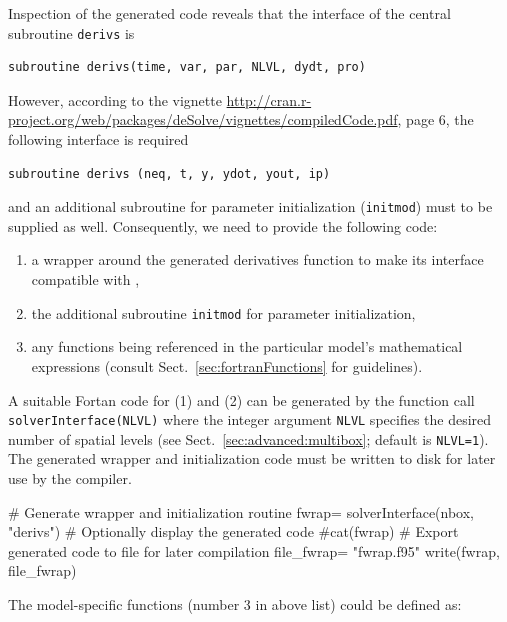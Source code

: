 \documentclass[times,onecolumn]{article}
\begin{document}
Inspection of the generated  code reveals that the interface of the central subroutine \verb|derivs| is

\begin{verbatim}
subroutine derivs(time, var, par, NLVL, dydt, pro)
\end{verbatim}

However, according to the  vignette \url{http://cran.r-project.org/web/packages/deSolve/vignettes/compiledCode.pdf}, page 6, the following interface is required

\begin{verbatim}
subroutine derivs (neq, t, y, ydot, yout, ip)
\end{verbatim}

and an additional subroutine for parameter initialization (\verb|initmod|) must to be supplied as well. Consequently, we need to provide the following  code:

\begin{enumerate}
\item a wrapper around the generated derivatives function to make its interface compatible with ,
\item the additional subroutine \verb|initmod| for parameter initialization,
\item any functions being referenced in the particular model's mathematical expressions (consult Sect.~\ref{sec:fortranFunctions} for guidelines).
\end{enumerate}

A suitable Fortan code for (1) and (2) can be generated by the function call \verb|solverInterface(NLVL)| where the integer argument \verb|NLVL| specifies the desired number of spatial levels (see Sect.~\ref{sec:advanced:multibox}; default is \verb|NLVL=1|). The generated wrapper and initialization code must be written to disk for later use by the compiler.

\begin{Schunk}
\begin{Sinput}
 # Generate wrapper and initialization routine
 fwrap= solverInterface(nbox, "derivs")
 # Optionally display the generated code
 #cat(fwrap)
 # Export generated code to file for later compilation
 file_fwrap= "fwrap.f95"
 write(fwrap, file_fwrap)
\end{Sinput}
\end{Schunk}

The model-specific functions (number 3 in above list) could be defined as:
\end{document}
